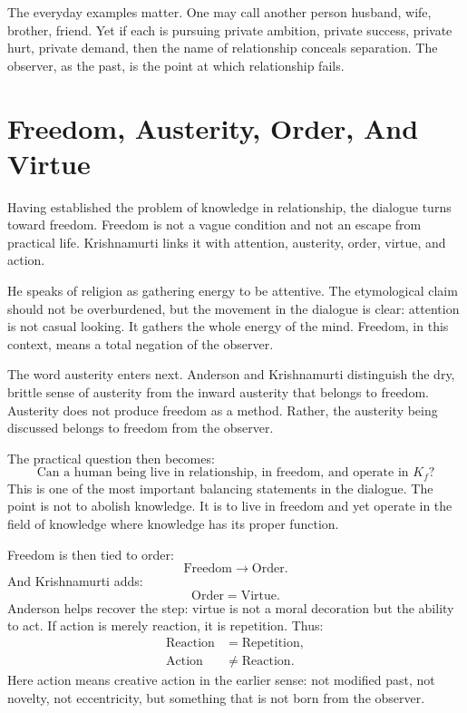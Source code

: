 The everyday examples matter. One may call another person husband, wife, brother, friend. Yet if each is pursuing private ambition, private success, private hurt, private demand, then the name of relationship conceals separation. The observer, as the past, is the point at which relationship fails.

\section{Freedom, Austerity, Order, And Virtue}

Having established the problem of knowledge in relationship, the dialogue turns toward freedom. Freedom is not a vague condition and not an escape from practical life. Krishnamurti links it with attention, austerity, order, virtue, and action.

He speaks of religion as gathering energy to be attentive. The etymological claim should not be overburdened, but the movement in the dialogue is clear: attention is not casual looking. It gathers the whole energy of the mind. Freedom, in this context, means a total negation of the observer.

The word austerity enters next. Anderson and Krishnamurti distinguish the dry, brittle sense of austerity from the inward austerity that belongs to freedom. Austerity does not produce freedom as a method. Rather, the austerity being discussed belongs to freedom from the observer.

The practical question then becomes:
\begin{equation}
\text{Can a human being live in relationship, in freedom, and operate in } K_f?
\end{equation}
This is one of the most important balancing statements in the dialogue. The point is not to abolish knowledge. It is to live in freedom and yet operate in the field of knowledge where knowledge has its proper function.

Freedom is then tied to order:
\begin{equation}
\mathrm{Freedom} \longrightarrow \mathrm{Order}.
\end{equation}
And Krishnamurti adds:
\begin{equation}
\mathrm{Order}=\mathrm{Virtue}.
\end{equation}
Anderson helps recover the step: virtue is not a moral decoration but the ability to act. If action is merely reaction, it is repetition. Thus:
\begin{align}
\mathrm{Reaction} &= \mathrm{Repetition},\\
\mathrm{Action} &\neq \mathrm{Reaction}.
\end{align}
Here action means creative action in the earlier sense: not modified past, not novelty, not eccentricity, but something that is not born from the observer.


